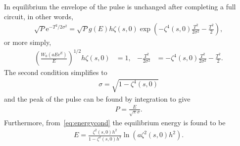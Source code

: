 \documentclass[12pt]{article}
\begin{document}
In equilibrium the envelope of the pulse is unchanged after completing a full circuit, in other words,
\begin{align*}
	\sqrt{P} \textrm{e}^{-T^2 / 2 \sigma^2} = 
	\sqrt{P} g(E) h \zeta(s, 0) \exp \left( -\zeta^4(s, 0) \frac{T^2}{2 \sigma^2} - \frac{T^2}{2} \right),
\end{align*}
or more simply,
\begin{align}
\label{eq:energycond}
	\left( \frac{W_0(a E \textrm{e}^E)}{E} \right)^{1/2} h \zeta(s, 0) &= 1,&
	-\frac{T^2}{2 \sigma^2} &= -\zeta^4(s, 0) \frac{T^2}{2 \sigma^2} - \frac{T^2}{2}.
\end{align}
The second condition simplifies to
\begin{align*}
	\sigma = \sqrt{1 - \zeta^4(s, 0)}
\end{align*}
and the peak of the pulse can be found by integration to give
\begin{align*}
	P = \frac{E}{\sqrt{\pi} \sigma}.
\end{align*}
Furthermore, from~\eqref{eq:energycond} the equilibrium energy is found to be
\begin{align*}
	E = \frac{\zeta^2(s, 0) h^2}{1 - \zeta^2(s, 0) h^2} \ln \left( a \zeta^2(s, 0) h^2 \right).
\end{align*}

\begin{figure}[htbp]
\centering
{}
\caption{}
\label{fig:zeta}
\end{figure}
\end{document}
